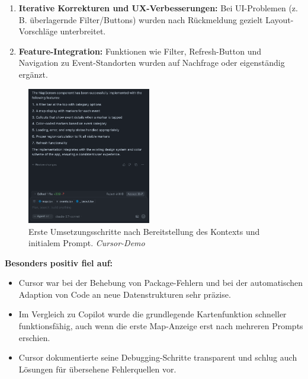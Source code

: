\begin{enumerate}[resume]
      \item \textbf{Iterative Korrekturen und UX-Verbesserungen:} Bei UI-Problemen (z.\,B. überlagernde Filter/Buttons) wurden nach Rückmeldung gezielt Layout-Vorschläge unterbreitet.
      \item \textbf{Feature-Integration:} Funktionen wie Filter, Refresh-Button und Navigation zu Event-Standorten wurden auf Nachfrage oder eigenständig ergänzt.
\end{enumerate}

\begin{figure}[htbp]
      \centering
      \includegraphics[width=0.48\textwidth]{images/cursor_screenshots/erster durchgang-cursor.png}
      \caption{Erste Umsetzungsschritte nach Bereitstellung des Kontexts und initialem Prompt. \textit{Cursor-Demo}}
      \label{fig:cursor-erster-durchgang}
\end{figure}

\textbf{Besonders positiv fiel auf:}
\begin{itemize}
      \item Cursor war bei der Behebung von Package-Fehlern und bei der automatischen
            Adaption von Code an neue Datenstrukturen sehr präzise.
      \item Im Vergleich zu Copilot wurde die grundlegende Kartenfunktion schneller
            funktionsfähig, auch wenn die erste Map-Anzeige erst nach mehreren Prompts
            erschien.
      \item Cursor dokumentierte seine Debugging-Schritte transparent und schlug auch
            Lösungen für übersehene Fehlerquellen vor.
\end{itemize}

